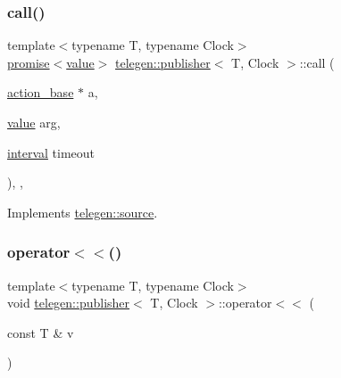 \subsubsection{\texorpdfstring{call()}{call()}}
{\footnotesize\ttfamily template$<$typename T, typename Clock$>$ \\
\hyperlink{namespacetelegen_a9dd802bb5d30cf96b0c616750d43ae86}{promise}$<$\hyperlink{classtelegen_1_1value}{value}$>$ \hyperlink{classtelegen_1_1publisher}{telegen\+::publisher}$<$ T, Clock $>$\+::call (\begin{DoxyParamCaption}\item[{\hyperlink{classtelegen_1_1action__base}{action\+\_\+base} $\ast$}]{a,  }\item[{\hyperlink{classtelegen_1_1value}{value}}]{arg,  }\item[{\hyperlink{namespacetelegen_ad925de2d0a99bc43918533abf0457344}{interval}}]{timeout }\end{DoxyParamCaption})\hspace{0.3cm}{\ttfamily [inline]}, {\ttfamily [override]}, {\ttfamily [virtual]}}



Implements \hyperlink{classtelegen_1_1source_ae14191b0e6aa10521bb3d8fa5e1747e9}{telegen\+::source}.

\mbox{\label{classtelegen_1_1publisher_a093ed11e3e992e0980dada475b154e86}} 
\subsubsection{\texorpdfstring{operator$<$$<$()}{operator<<()}}
{\footnotesize\ttfamily template$<$typename T, typename Clock$>$ \\
void \hyperlink{classtelegen_1_1publisher}{telegen\+::publisher}$<$ T, Clock $>$\+::operator$<$$<$ (\begin{DoxyParamCaption}\item[{const T \&}]{v }\end{DoxyParamCaption})\hspace{0.3cm}{\ttfamily [inline]}}

\mbox{\label{classtelegen_1_1publisher_ad2111d40973f4bfd5d4bde64d736eb84}} 
